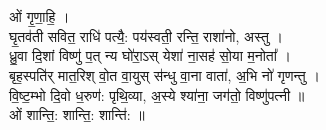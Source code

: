 \section{}
ओं गृ॒णा॒हि॒ ।\\
घृ॒तव॑ती सवित॒ राधि॑ पत्यै॒: पय॑स्वती॒ रन्ति॒ राशा॑नो, अस्तु ।\\
ध्रु॒वा दि॒शां विष्णु॑ प॒त् न्य घो॑रा॒ऽस् येशा॑ ना॒सह॑ सो॒या म॒नोता᳚ ।\\
बृह॒स्पति॑र् मात॒रिश् वो॒त वा॒युस् स॑न्धु वा॒ना वाता॑, अ॒भि नो॑ गृणन्तु ।\\
वि॒ष्ट॒म्भो दि॒वो ध॒रुण॑: पृथि॒व्या, अ॒स्ये श्या॑ना॒ जग॑तो॒ विष्णु॑पत्नी ॥\\
ओं शान्ति॒: शान्ति॒: शान्ति॑: ॥\\
